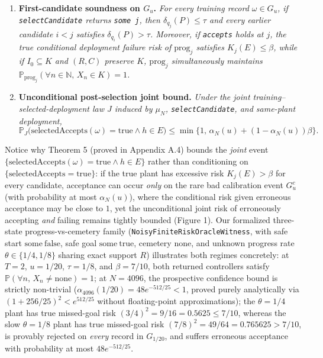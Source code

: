 \documentclass[11pt,a4paper]{article}
\newcounter{none}
\providecommand{\tightlist}{\setlength{\itemsep}{2pt}\setlength{\parskip}{0pt}}
\begin{document}
\begin{enumerate}
\def\labelenumi{\arabic{enumi}.}
\tightlist
\item
  \textbf{First-candidate soundness on \(G_u\).} \emph{For every
  training record \(\omega \in G_u\), if \texttt{selectCandidate}
  returns \texttt{some\ j}, then \(\delta_{q_j}(P) \le \tau\) and every
  earlier candidate \(i < j\) satisfies \(\delta_{q_i}(P) > \tau\).
  Moreover, if \texttt{accepts} holds at \(j\), the true conditional
  deployment failure risk of \(\mathrm{prog}_j\) satisfies
  \(K_j(E) \le \beta\), while if \(I_0 \subseteq K\) and \((R, C)\)
  preserve \(K\), \(\mathrm{prog}_j\) simultaneously maintains
  \(\mathbb{P}_{\mathrm{prog}_j}(\forall n \in \mathbb{N},\, X_n \in K) = 1\).}
\item
  \textbf{Unconditional post-selection joint bound.} \emph{Under the
  joint training--selected-deployment law \(J\) induced by \(\mu_N\),
  \texttt{selectCandidate}, and same-plant deployment,}
  \[\mathbb{P}_J\bigl(\mathrm{selectedAccepts}(\omega) = \mathrm{true} \land h \in E\bigr)
  \le \min\bigl\{1,\, \alpha_N(u) + (1 - \alpha_N(u))\beta\bigr\}.\]
\end{enumerate}

Notice why Theorem 5 (proved in Appendix A.4) bounds the \emph{joint}
event
\(\{\mathrm{selectedAccepts}(\omega) = \mathrm{true} \land h \in E\}\)
rather than conditioning on
\(\{\mathrm{selectedAccepts} = \mathrm{true}\}\): if the true plant has
excessive risk \(K_j(E) > \beta\) for every candidate, acceptance can
occur \emph{only} on the rare bad calibration event \(G_u^c\) (with
probability at most \(\alpha_N(u)\)), where the conditional risk given
erroneous acceptance may be close to \(1\), yet the unconditional joint
risk of erroneously accepting \emph{and} failing remains tightly bounded
(Figure 1). Our formalized three-state progress-vs-cemetery family
(\texttt{NoisyFiniteRiskOracleWitness}, with safe start
\(\mathrm{some\ false}\), safe goal \(\mathrm{some\ true}\), cemetery
\(\mathrm{none}\), and unknown progress rate \(\theta \in \{1/4, 1/8\}\)
sharing exact support \(R\)) illustrates both regimes concretely: at
\(T=2\), \(u = 1/20\), \(\tau = 1/8\), and \(\beta = 7/10\), both
returned controllers satisfy
\(\mathbb{P}(\forall n,\, X_n \neq \mathrm{none}) = 1\); at
\(N = 4096\), the prospective confidence bound is strictly non-trivial
(\(\alpha_{4096}(1/20) = 48 e^{-512/25} < 1\), proved purely
analytically via \((1 + 256/25)^2 < e^{512/25}\) without floating-point
approximations); the \(\theta = 1/4\) plant has true missed-goal risk
\((3/4)^2 = 9/16 = 0.5625 \le 7/10\), whereas the slow \(\theta = 1/8\)
plant has true missed-goal risk \((7/8)^2 = 49/64 = 0.765625 > 7/10\),
is provably rejected on \emph{every} record in \(G_{1/20}\), and suffers
erroneous acceptance with probability at most \(48 e^{-512/25}\).
\end{document}
